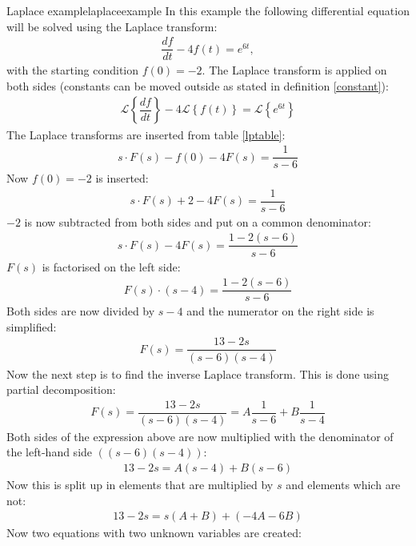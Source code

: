 \begin{example}{Laplace example}{laplaceexample}
In this example the following differential equation will be solved using the Laplace transform:
\begin{align}
\dfrac{df}{dt}-4f(t)=e^{6t}, \label{lpexinieq}
\end{align} 
with the starting condition $f(0)=-2$. The Laplace transform is applied on both sides (constants can be moved outside as stated in definition \ref{constant}):
\begin{align*}
\mathcal{L} \left\{\dfrac{df}{dt} \right\}-4 
\mathcal{L} \left\{f(t) \right\} = 
\mathcal{L} \left\{e^{6t} \right\}
\end{align*}
The Laplace transforms are inserted from table \ref{lptable}:
\begin{align*}
s \cdot F(s) - f(0) - 4F(s)= \dfrac{1}{s-6}
\end{align*}
Now $f(0)=-2$ is inserted:
\begin{align*}
s \cdot F(s) + 2 - 4F(s)= \dfrac{1}{s-6}
\end{align*}
$-2$ is now subtracted from both sides and put on a common denominator:
\begin{align*}
s \cdot F(s) - 4F(s)= \dfrac{1-2(s-6)}{s-6}
\end{align*}
$F(s)$ is factorised on the left side:
\begin{align*}
F(s) \cdot (s-4) = \dfrac{1-2(s-6)}{s-6}
\end{align*}
Both sides are now divided by $s-4$ and the numerator on the right side is simplified:
\begin{align*}
F(s) = \dfrac{13-2s}{(s-6)(s-4)}
\end{align*}
Now the next step is to find the inverse Laplace transform. This is done using partial decomposition: \cite[p. 537]{calc}
\begin{align}
F(s) = \dfrac{13-2s}{(s-6)(s-4)} = A \dfrac{1}{s-6} + B \dfrac{1}{s-4}
\label{par_dec}
\end{align}
Both sides of the expression above are now multiplied with the denominator of the left-hand side $((s-6)(s-4))$:
\begin{align*}
13-2s = A(s-4) + B(s-6)
\end{align*}
Now this is split up in elements that are multiplied by $s$ and elements which are not:
\begin{align*}
13-2s = s(A+B)+(-4A-6B)
\end{align*}
Now two equations with two unknown variables are created:
\begin{align*}

\end{align*}
\end{example}
